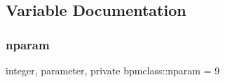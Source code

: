 \subsection{Variable Documentation}
\mbox{\label{namespacebpmclass_ac2f2f373976236d08c9c68de895950eb}} 
\subsubsection{\texorpdfstring{nparam}{nparam}}
{\footnotesize\ttfamily integer, parameter, private bpmclass\+::nparam = 9\hspace{0.3cm}{\ttfamily [private]}}

